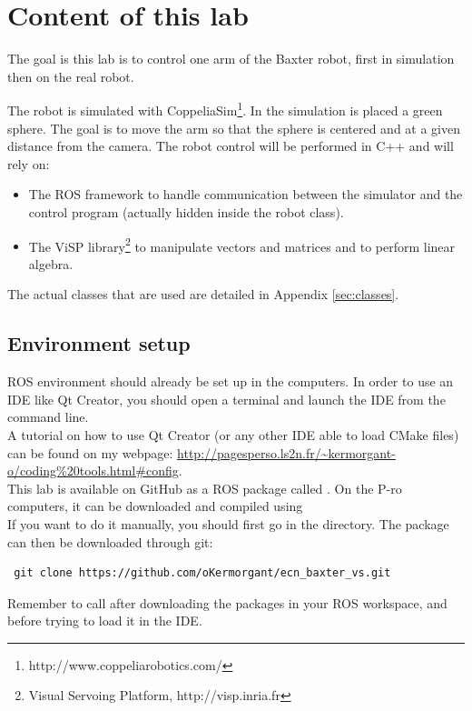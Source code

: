 \documentclass{ecnreport}
\begin{document}


\section{Content of this lab}

The goal is this lab is to control one arm of the Baxter robot, first in simulation then on the real robot. 

The robot is simulated with CoppeliaSim\footnote{http://www.coppeliarobotics.com/}.
In the simulation is placed a green sphere. The goal is to move the arm so that the sphere is centered and at a given distance from the camera.
The robot control will be performed in C++ and will rely on:

\begin{itemize}
 \item The ROS framework to handle communication between the simulator and the control program (actually hidden inside the robot class).
 \item The ViSP library\footnote{Visual Servoing Platform, http://visp.inria.fr} to manipulate vectors and matrices and to perform linear algebra.
\end{itemize}
The actual classes that are used are detailed in Appendix \ref{sec:classes}.\\

\subsection{Environment setup}

ROS environment should already be set up in the computers. 
In order to use an IDE like Qt Creator, you should open a terminal and launch the IDE from the command line.\\ A tutorial on how to use Qt Creator (or any other IDE 
able to load CMake files) can be found on my webpage: \url{http://pagesperso.ls2n.fr/~kermorgant-o/coding\%20tools.html#config}.\\

This lab is available on GitHub as a ROS package called . 
On the P-ro computers, it can be downloaded and compiled using \\

If you want to do it manually, you should first go in the  directory. The package can then be downloaded through git:
\begin{center}\cppstyle
\begin{lstlisting}
 git clone https://github.com/oKermorgant/ecn_baxter_vs.git
\end{lstlisting}
\end{center}
Remember to call {} after downloading the packages in your ROS workspace, and before trying to load it in the IDE.
\end{document}
